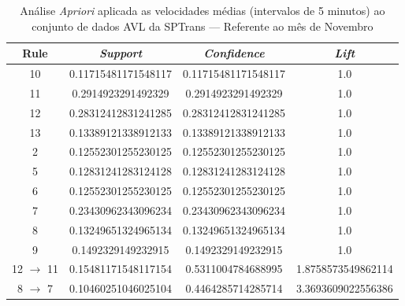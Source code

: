 \documentclass[
	12pt,				%
	oneside,			%
	a4paper,			%
	english,			%
	brazil				%
	]{abntex2ppgsi}
\begin{document}
\begin{apendicesenv}
\begin{table}[!htb]
\centering
\caption {Análise \textit{Apriori} aplicada as velocidades médias (intervalos de 5 minutos) ao conjunto de dados AVL da SPTrans --- Referente ao mês de Novembro}
\label {tab:aprioriNovember}
\begin{tabular}{c|c|c|c}
\hline
\textbf{Rule} & \textit{\textbf{Support}} & \textit{\textbf{Confidence}} & \textit{\textbf{Lift}} \\
\hline
10 &  0.11715481171548117 &  0.11715481171548117 &  1.0\\
\hline
11 &  0.2914923291492329 &  0.2914923291492329 &  1.0\\
\hline
12 &  0.28312412831241285 &  0.28312412831241285 &  1.0\\
\hline
13 &  0.13389121338912133 &  0.13389121338912133 &  1.0\\
\hline
2 &  0.12552301255230125 &  0.12552301255230125 &  1.0\\
\hline
5 &  0.12831241283124128 &  0.12831241283124128 &  1.0\\
\hline
6 &  0.12552301255230125 &  0.12552301255230125 &  1.0\\
\hline
7 &  0.23430962343096234 &  0.23430962343096234 &  1.0\\
\hline
8 &  0.13249651324965134 &  0.13249651324965134 &  1.0\\
\hline
9 &  0.1492329149232915 &  0.1492329149232915 &  1.0\\
\hline
12 $\rightarrow$ 11 &  0.15481171548117154 &  0.5311004784688995 &  1.8758573549862114\\
\hline
8 $\rightarrow$ 7 &  0.10460251046025104 &  0.4464285714285714 &  3.3693609022556386\\
\hline
\end{tabular}
\end{table}



\end{apendicesenv}
\end{document}
